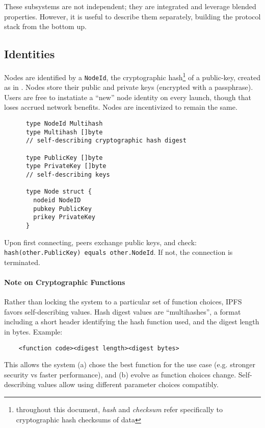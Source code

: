 \documentclass{sig-alternate}
\begin{document}
These subsystems are not independent; they are integrated and leverage
blended properties. However, it is useful to describe them separately,
building the protocol stack from the bottom up.


\subsection{Identities}

Nodes are identified by a \texttt{NodeId}, the cryptographic hash\footnote{throughout this document, \textit{hash} and \textit{checksum} refer specifically to cryptographic hash checksums of data} of a public-key, created as in \cite{skademlia}. Nodes store their public and private keys (encrypted with a passphrase). Users are free to instatiate a ``new'' node identity on every launch, though that loses accrued network benefits. Nodes are incentivized to remain the same.

\begin{verbatim}
      type NodeId Multihash
      type Multihash []byte
      // self-describing cryptographic hash digest

      type PublicKey []byte
      type PrivateKey []byte
      // self-describing keys

      type Node struct {
        nodeid NodeID
        pubkey PublicKey
        prikey PrivateKey
      }
\end{verbatim}

Upon first connecting, peers exchange public keys, and check: \texttt{hash(other.PublicKey) equals other.NodeId}. If not, the connection is terminated.

\paragraph{Note on Cryptographic Functions} Rather than locking the system to a particular set of function choices, IPFS favors self-describing values. Hash digest values are ``multihashes'', a format including a short header identifying the hash function used, and the digest length in bytes. Example:

\begin{verbatim}
    <function code><digest length><digest bytes>

\end{verbatim}

This allows the system (a) chose the best function for the use case (e.g. stronger security vs faster performance), and (b) evolve as function choices change. Self-describing values allow using different parameter choices compatibly.
\end{document}
